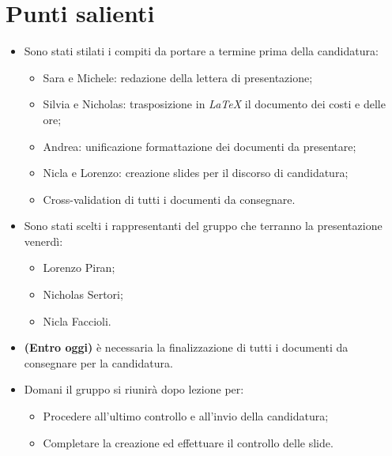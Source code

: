 \documentclass[11pt]{article}
\begin{document}
	\newpage

	\section{Punti salienti}
		\begin{itemize}
			\item Sono stati stilati i compiti da portare a termine prima della candidatura:
			\begin{itemize}
				\item Sara e Michele: redazione della lettera di presentazione;
				\item Silvia e Nicholas: trasposizione in \textit{LaTeX} il documento dei costi e delle ore;
				\item Andrea: unificazione formattazione dei documenti da presentare;
				\item Nicla e Lorenzo: creazione slides per il discorso di candidatura;
				\item Cross-validation di tutti i documenti da consegnare.
			\end{itemize}
			\item Sono stati scelti i rappresentanti del gruppo che terranno la presentazione venerdì: 
			\begin{itemize}
				\item Lorenzo Piran;
				\item Nicholas Sertori;
				\item Nicla Faccioli.
			\end{itemize}
			\item \textbf{(Entro oggi)} è necessaria la finalizzazione di tutti i documenti da consegnare per la candidatura.
			\item Domani il gruppo si riunirà dopo lezione per:
			\begin{itemize}
				\item Procedere all'ultimo controllo e all'invio della candidatura;
				\item Completare la creazione ed effettuare il controllo delle slide.
			\end{itemize}
		\end{itemize}
\end{document}
